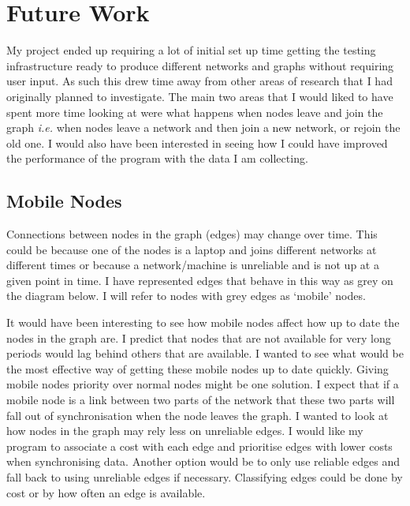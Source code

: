 \documentclass[12pt]{article}
\begin{document}
\newpage
\section{Future Work}
My project ended up requiring a lot of initial set up
time getting the testing infrastructure ready to
produce different networks and graphs without requiring
user input. As such this drew time away from other
areas of research that I had originally planned to
investigate. The main two areas that I would liked
to have spent more time looking at were what happens
when nodes leave and join the graph \emph{i.e.} when
nodes leave a network and then join a new network, or
rejoin the old one. I would also have been interested
in seeing how I could have improved the performance
of the program with the data I am collecting.

\subsection{Mobile Nodes}
\label{sec:mobile}
Connections between nodes in the graph (edges) may
change over time. This could be because one of the nodes
is a laptop and joins different networks at different
times or because a network/machine is unreliable and is
not up at a given point in time. I have represented
edges that behave in this way as grey on the diagram below.
I will refer to nodes with grey edges as `mobile' nodes.

It would have been interesting to see how mobile nodes affect how
up to date the nodes in the graph are. I predict that
nodes that are not available for very long periods would lag behind
others that are available. I wanted to see what would be
the most effective way of getting these mobile nodes
up to date quickly. Giving mobile nodes priority over
normal nodes might be one solution.
I expect that if a mobile
node is a link between two parts of the network that
these two parts will fall out of synchronisation when the node
leaves the graph. I wanted to look
at how nodes in the graph may 
rely less on unreliable edges. I would like my program
to associate a cost with each edge and prioritise edges
with lower costs when synchronising data. Another option
would be to only use reliable edges and fall back to using
unreliable edges if necessary. Classifying edges could be
done by cost or by how often an edge is available.
\end{document}
